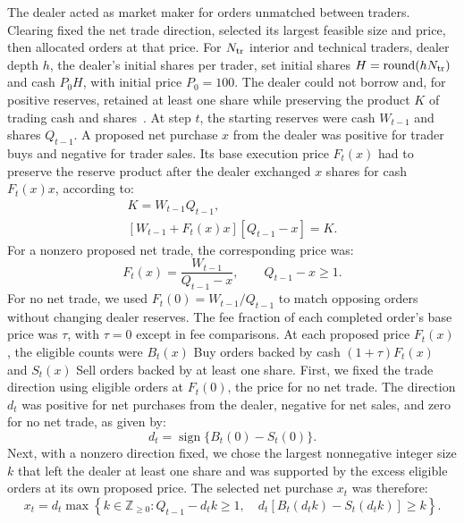 The dealer acted as market maker for orders unmatched between traders.
Clearing fixed the net trade direction, selected its largest feasible
size and price, then allocated orders at that price. For $N_{\rm tr}$
interior and technical traders, dealer depth $h$, the dealer's initial shares per trader, set initial shares
$H=\operatorname{round}(hN_{\rm tr})$ and cash $P_0H$, with initial
price $P_0=100$. The dealer could not borrow and, for positive reserves,
retained at least one share while preserving the product $K$ of trading
cash and shares~\cite{angeris2022constant}. At step $t$, the starting
reserves were cash $W_{t-1}$ and shares $Q_{t-1}$.
A proposed net purchase $x$ from the dealer was positive for trader
buys and negative for trader sales. Its base execution price $F_t(x)$
had to preserve the reserve product after the dealer exchanged $x$
shares for cash $F_t(x)x$, according to:
\begin{gather*}
  K=W_{t-1}Q_{t-1},\\
  [W_{t-1}+F_t(x)x][Q_{t-1}-x]=K.
\end{gather*}
For a nonzero proposed net trade, the corresponding price was:
\begin{equation}
  F_t(x)=\frac{W_{t-1}}{Q_{t-1}-x},\qquad Q_{t-1}-x\geq1.
  \label{eq:execution-price}
\end{equation}
For no net trade, we used $F_t(0)=W_{t-1}/Q_{t-1}$ to match opposing
orders without changing dealer reserves. The fee fraction of each
completed order's base price was $\tau$, with $\tau=0$ except in fee
comparisons. At each proposed price $F_t(x)$, the eligible counts were $B_t(x)$ Buy
orders backed by cash $(1+\tau)F_t(x)$ and $S_t(x)$ Sell orders backed
by at least one share. First, we fixed the trade direction using eligible orders at
$F_t(0)$, the price for no net trade. The direction
$d_t$ was positive for net purchases from the dealer, negative for net
sales, and zero for no net trade, as given by:
\begin{equation*}
  d_t=\operatorname{sign}\{B_t(0)-S_t(0)\}.
\end{equation*}
Next, with a nonzero direction fixed, we chose the largest nonnegative
integer size $k$ that left the dealer at least one share and was
supported by the excess eligible orders at its own proposed price.
The selected net purchase $x_t$ was therefore:
\begin{equation}
 x_t=d_t\max\left\{k\in\mathbb{Z}_{\geq0}:
 Q_{t-1}-d_tk\geq1,\quad
 d_t[B_t(d_tk)-S_t(d_tk)]\geq k\right\}.
 \label{eq:dealer-buy-excess}
\end{equation}
